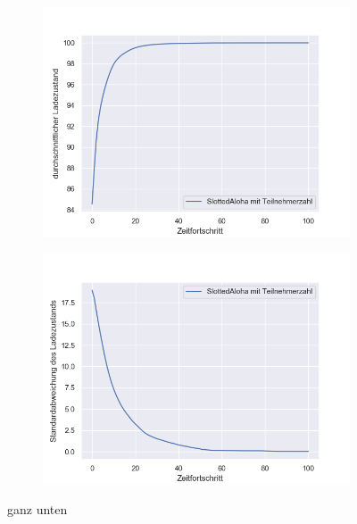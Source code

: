 \begin{figure}
	\begin{subfigure}{0.49\linewidth}
		\includegraphics[width=\linewidth]{img/SA_par/SlottedAloha_participants_VDE_tau_10_soc_mean.png}
        \label{ABB_SAparSocMEAN}
	\end{subfigure}
	\begin{subfigure}{0.49\linewidth}
		\includegraphics[width=\linewidth]{img/SA_par/SlottedAloha_participants_VDE_tau_10_soc_std.png}
        \label{ABB_SAparSocSTD}
	\end{subfigure}
	\caption{ganz unten}
\end{figure}
